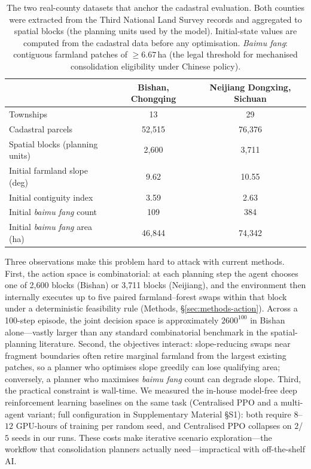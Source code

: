 \documentclass[11pt]{article}
\begin{document}
\begin{table}[htbp]
\centering
\small
\caption{The two real-county datasets that anchor the cadastral evaluation. Both counties were extracted from the Third National Land Survey records and aggregated to spatial blocks (the planning units used by the model). Initial-state values are computed from the cadastral data before any optimisation. \textit{Baimu fang}: contiguous farmland patches of $\geq 6.67$\,ha (the legal threshold for mechanised consolidation eligibility under Chinese policy).}
\label{tab:counties}
\begin{tabular}{lcc}
\toprule
 & Bishan, Chongqing & Neijiang Dongxing, Sichuan \\
\midrule
Townships                                & 13       & 29       \\
Cadastral parcels                        & 52{,}515 & 76{,}376 \\
Spatial blocks (planning units)          & 2{,}600  & 3{,}711  \\
Initial farmland slope (deg)             & 9.62     & 10.55    \\
Initial contiguity index                 & 3.59     & 2.63     \\
Initial \textit{baimu fang} count        & 109      & 384      \\
Initial \textit{baimu fang} area (ha)    & 46{,}844 & 74{,}342 \\
\bottomrule
\end{tabular}
\end{table}

Three observations make this problem hard to attack with current methods. First, the action space is combinatorial: at each planning step the agent chooses one of 2{,}600 blocks (Bishan) or 3{,}711 blocks (Neijiang), and the environment then internally executes up to five paired farmland--forest swaps within that block under a deterministic feasibility rule (Methods, \S\ref{sec:methods-action}). Across a 100-step episode, the joint decision space is approximately $2600^{100}$ in Bishan alone---vastly larger than any standard combinatorial benchmark in the spatial-planning literature. Second, the objectives interact: slope-reducing swaps near fragment boundaries often retire marginal farmland from the largest existing patches, so a planner who optimises slope greedily can lose qualifying area; conversely, a planner who maximises \textit{baimu fang} count can degrade slope. Third, the practical constraint is wall-time. We measured the in-house model-free deep reinforcement learning baselines on the same task (Centralised PPO and a multi-agent variant; full configuration in Supplementary Material \S S1): both require $8$--$12$ GPU-hours of training per random seed, and Centralised PPO collapses on $2$/$5$ seeds in our runs. These costs make iterative scenario exploration---the workflow that consolidation planners actually need---impractical with off-the-shelf AI.
\end{document}
